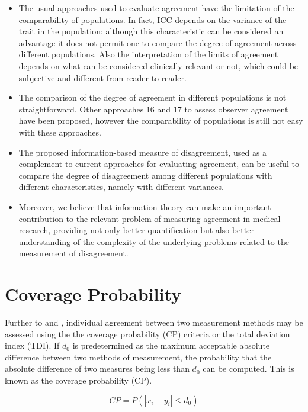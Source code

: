 \documentclass[12pt, a4paper]{report}
\theoremstyle{plain}
\theoremstyle{definition}
\theoremstyle{remark}
\begin{document}
\begin{itemize}
		\item The usual approaches used to evaluate agreement have the limitation of the comparability of populations. In fact, ICC depends on the variance of the trait in the population; although this characteristic can be considered an advantage it does not permit one to compare the degree of agreement across different populations. Also the interpretation of the limits of agreement depends on what can be considered clinically relevant or not, which could be subjective and different from reader to reader. 
		
		\item The comparison of the degree of agreement in different populations is not straightforward. Other approaches 16 and 17 to assess observer agreement have been proposed, however the comparability of populations is still not easy with these approaches.
		
		\item The proposed information-based measure of disagreement, used as a complement to current approaches for evaluating agreement, can be useful to compare the degree of disagreement among different populations with different characteristics, namely with different variances.
		
		\item Moreover, we believe that information theory can make an important contribution to the relevant problem of measuring agreement in medical research, providing not only better quantification but also better understanding of the complexity of the underlying problems related to the measurement of disagreement.
	\end{itemize}
	\section{Coverage Probability}
	Further to  \citet{lin2000} and \citet{lin2002}, individual agreement between two measurement methods may be
	assessed using the the coverage probability (CP) criteria or the total deviation index (TDI). If $d_{0}$ is predetermined as the maximum acceptable absolute difference between two methods of measurement, the probability that the absolute difference of two measures being less than $d_{0}$ can be computed. This is known as the coverage probability (CP).
	
	\begin{equation}
	CP = P(|x_{i} - y_{i}| \leq d_{0})
	\end{equation}
	
\end{document}
